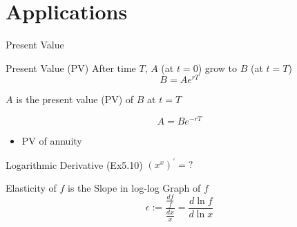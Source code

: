 \documentclass[a4paper,11pt]{article}
\begin{document}
\section{Applications} %
\label{sec:applications}
\begin{frame}[t]{Present Value}
	\begin{block}{Present Value (PV)}
		After time $T$, $A$ (at $t=0$) grow to $B$ (at $t=T$)
		\[
			B = Ae^{rT}
		\]
	
		$A$ is the present value (PV) of $B$ at $t=T$
	
		\[
			A = Be^{-rT}
		\]
	\end{block}
	
	\begin{itemize}
		\item PV of annuity
	\end{itemize}
\end{frame}

\begin{frame}[t]{Logarithmic Derivative}
	(Ex5.10) $(x^x)^\prime = ?$
	
	\begin{block}
		{Elasticity of $f$ is the Slope in log-log Graph of $f$}
		\[
			\epsilon := \frac{\frac{df}{f}}{\frac{dx}{x}} = \frac{d\ln f }{d\ln x}
		\]
	\end{block}
	
\end{frame}
	
\end{document}
